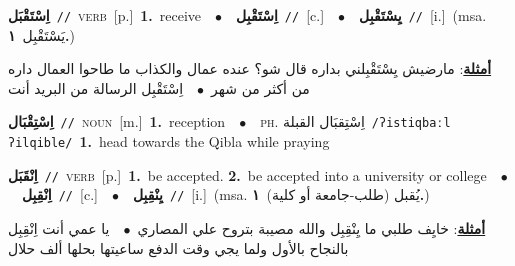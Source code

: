 \documentclass[10pt,a4paper,twoside]{article} %
\begin{document}
\begin{multicols}{2}
{\setlength\topsep{0pt}\textbf{\foreignlanguage{arabic}{اِسْتَقْبَل}}\ {\color{gray}\texttt{//}\color{black}}\ \textsc{verb}\ [p.]\ \textbf{1.}~receive\ \ $\bullet$\ \ \setlength\topsep{0pt}\textbf{\foreignlanguage{arabic}{اِسْتَقْبِل}}\ {\color{gray}\texttt{//}\color{black}}\ [c.]\ \ $\bullet$\ \ \setlength\topsep{0pt}\textbf{\foreignlanguage{arabic}{يِسْتَقْبِل}}\ {\color{gray}\texttt{//}\color{black}}\ [i.]\ \color{gray}(msa. \foreignlanguage{arabic}{يَسْتَقْبِل}~\foreignlanguage{arabic}{\textbf{١.}})\color{black}\  \begin{flushright}\color{gray}\foreignlanguage{arabic}{\textbf{\underline{\foreignlanguage{arabic}{أمثلة}}}: مارضيش يِسْتَقْبِلني بداره قال شو؟ عنده عمال والكذاب ما طاحوا العمال داره من أكثر من شهر\ $\bullet$\ \  اِسْتَقْبِل الرسالة من البريد أنت}\end{flushright}\color{black}} \vspace{2mm}

{\setlength\topsep{0pt}\textbf{\foreignlanguage{arabic}{اِسْتِقْبَال}}\ {\color{gray}\texttt{//}\color{black}}\ \textsc{noun}\ [m.]\ \textbf{1.}~reception\ \ $\bullet$\ \ \textsc{ph.} \color{gray} \foreignlanguage{arabic}{اِسْتِقبَال القبلة}\color{black}\ {\color{gray}\texttt{/{\sffamily ʔistiqbaːl ʔilqible}/}\color{black}}\ \textbf{1.}~head towards the Qibla while praying\ } \vspace{2mm}

{\setlength\topsep{0pt}\textbf{\foreignlanguage{arabic}{اِنْقَبَل}}\ {\color{gray}\texttt{//}\color{black}}\ \textsc{verb}\ [p.]\ \textbf{1.}~be accepted.  \textbf{2.}~be accepted into a university or college\ \ $\bullet$\ \ \setlength\topsep{0pt}\textbf{\foreignlanguage{arabic}{اِنْقِبِل}}\ {\color{gray}\texttt{//}\color{black}}\ [c.]\ \ $\bullet$\ \ \setlength\topsep{0pt}\textbf{\foreignlanguage{arabic}{يِنْقِبِل}}\ {\color{gray}\texttt{//}\color{black}}\ [i.]\ \color{gray}(msa. \foreignlanguage{arabic}{يُقبل (طلب-جامعة أو كلية)}~\foreignlanguage{arabic}{\textbf{١.}})\color{black}\  \begin{flushright}\color{gray}\foreignlanguage{arabic}{\textbf{\underline{\foreignlanguage{arabic}{أمثلة}}}: خايِف طلبي ما يِنْقِبِل والله مصيبة بتروح علي المصاري\ $\bullet$\ \  يا عمي أنت اِنْقِبِل بالنجاح بالأول ولما يجي وقت الدفع ساعيتها بحلها ألف حلال}\end{flushright}\color{black}} \vspace{2mm}


\end{multicols}
\end{document}
